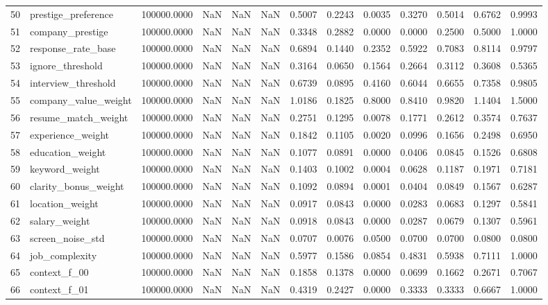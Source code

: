 \begin{tabular}{rlrrlrrrrrrrr}
50 & prestige_preference & 100000.0000 & NaN & NaN & NaN & 0.5007 & 0.2243 & 0.0035 & 0.3270 & 0.5014 & 0.6762 & 0.9993 \\
51 & company_prestige & 100000.0000 & NaN & NaN & NaN & 0.3348 & 0.2882 & 0.0000 & 0.0000 & 0.2500 & 0.5000 & 1.0000 \\
52 & response_rate_base & 100000.0000 & NaN & NaN & NaN & 0.6894 & 0.1440 & 0.2352 & 0.5922 & 0.7083 & 0.8114 & 0.9797 \\
53 & ignore_threshold & 100000.0000 & NaN & NaN & NaN & 0.3164 & 0.0650 & 0.1564 & 0.2664 & 0.3112 & 0.3608 & 0.5365 \\
54 & interview_threshold & 100000.0000 & NaN & NaN & NaN & 0.6739 & 0.0895 & 0.4160 & 0.6044 & 0.6655 & 0.7358 & 0.9805 \\
55 & company_value_weight & 100000.0000 & NaN & NaN & NaN & 1.0186 & 0.1825 & 0.8000 & 0.8410 & 0.9820 & 1.1404 & 1.5000 \\
56 & resume_match_weight & 100000.0000 & NaN & NaN & NaN & 0.2751 & 0.1295 & 0.0078 & 0.1771 & 0.2612 & 0.3574 & 0.7637 \\
57 & experience_weight & 100000.0000 & NaN & NaN & NaN & 0.1842 & 0.1105 & 0.0020 & 0.0996 & 0.1656 & 0.2498 & 0.6950 \\
58 & education_weight & 100000.0000 & NaN & NaN & NaN & 0.1077 & 0.0891 & 0.0000 & 0.0406 & 0.0845 & 0.1526 & 0.6808 \\
59 & keyword_weight & 100000.0000 & NaN & NaN & NaN & 0.1403 & 0.1002 & 0.0004 & 0.0628 & 0.1187 & 0.1971 & 0.7181 \\
60 & clarity_bonus_weight & 100000.0000 & NaN & NaN & NaN & 0.1092 & 0.0894 & 0.0001 & 0.0404 & 0.0849 & 0.1567 & 0.6287 \\
61 & location_weight & 100000.0000 & NaN & NaN & NaN & 0.0917 & 0.0843 & 0.0000 & 0.0283 & 0.0683 & 0.1297 & 0.5841 \\
62 & salary_weight & 100000.0000 & NaN & NaN & NaN & 0.0918 & 0.0843 & 0.0000 & 0.0287 & 0.0679 & 0.1307 & 0.5961 \\
63 & screen_noise_std & 100000.0000 & NaN & NaN & NaN & 0.0707 & 0.0076 & 0.0500 & 0.0700 & 0.0700 & 0.0800 & 0.0800 \\
64 & job_complexity & 100000.0000 & NaN & NaN & NaN & 0.5977 & 0.1586 & 0.0854 & 0.4831 & 0.5938 & 0.7111 & 1.0000 \\
65 & context_f_00 & 100000.0000 & NaN & NaN & NaN & 0.1858 & 0.1378 & 0.0000 & 0.0699 & 0.1662 & 0.2671 & 0.7067 \\
66 & context_f_01 & 100000.0000 & NaN & NaN & NaN & 0.4319 & 0.2427 & 0.0000 & 0.3333 & 0.3333 & 0.6667 & 1.0000 \\

\end{tabular}
